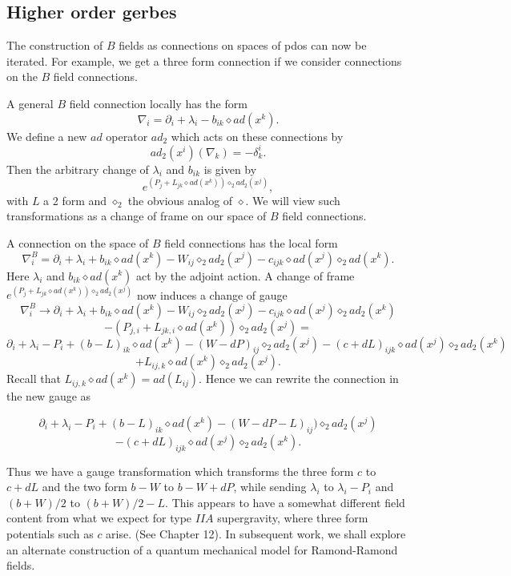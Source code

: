 \documentclass[a4paper,11pt]{amsart}
\begin{document}
\subsection{Higher order gerbes}\label{failsC}
The construction of $B$ fields as connections on spaces of 
pdos can now be iterated. For example, we get a three form connection 
if we consider connections on the $B$ field connections. 

A general $B$ field connection locally has the form 
$$\nabla_i = \partial_i + \lambda_i - b_{ik}\diamond ad(x^k).$$
We define a new $ad$ operator $ad_2$ which acts on these connections by 
$$ad_2(x^i)(\nabla_k) = -\delta^i_k.$$
Then the arbitrary change of $\lambda_i$ and $b_{ik}$ is given by 
$$e^{(P_j + L_{jk}\diamond ad(x^k))\diamond_2ad_2(x^j)},$$
with $L$ a 2 form and $\diamond_2$ the obvious analog of $\diamond$. 
We will view such transformations as a change of frame on our space of $B$ field
connections. 

A connection on the space of $B$ field connections has the local form 
$$\nabla_i^B = \partial_i + \lambda_i + b_{ik}\diamond ad(x^k)
 - W_{ij}\diamond_2ad_2(x^j) - c_{ijk}\diamond
ad(x^j)\diamond_2 ad(x^k).$$
Here $\lambda_i$ and $b_{ik}\diamond ad(x^k)$ act by the adjoint action. 
A change of frame $e^{(P_j + L_{jk}\diamond ad(x^k))\diamond_2ad_2(x^j)}$ now induces 
a change of gauge 
$$\nabla_i^B\rightarrow \partial_i + \lambda_i + b_{ik}\diamond ad(x^k)
- W_{ij}\diamond_2ad_2(x^j) - c_{ijk}\diamond
ad(x^j)\diamond_2 ad_2(x^k)$$
$$ - (P_{j,i} + L_{jk,i}\diamond ad(x^k))\diamond_2ad_2(x^j) = $$
$$\partial_i + \lambda_i - P_i + (b-L)_{ik}\diamond ad(x^k) 
- (W-dP)_{ij}\diamond_2ad_2(x^j) - (c+dL)_{ijk}\diamond
ad(x^j)\diamond_2 ad_2(x^k)$$
$$ + L_{ij,k}\diamond ad(x^k)\diamond_2ad_2(x^j). $$
Recall that 
$L_{ij,k}\diamond ad(x^k) = ad(L_{ij}).$ Hence we can rewrite the connection in
the new gauge as 

$$\partial_i + \lambda_i - P_i + (b-L)_{ik}\diamond ad(x^k) 
- (W - dP-L)_{ij})\diamond_2ad_2(x^j)$$
$$ - (c+dL)_{ijk}\diamond ad(x^j)\diamond_2 ad_2(x^k). $$

Thus we have a gauge transformation which transforms the three form $c$ 
to $c+dL$ and the two form $b-W$ to $b-W+dP$, while sending 
$\lambda_i$ to $\lambda_i-P_i$ and $(b+W)/2$ to $(b+W)/2  - L$.  This appears
to have a somewhat different field content from what we expect for type $IIA$
supergravity, where three form potentials such as $c$ arise. 
(See \cite{P2}{Chapter 12}). In subsequent work, we shall explore an alternate construction of a
quantum mechanical model for Ramond-Ramond fields. 
\end{document}
